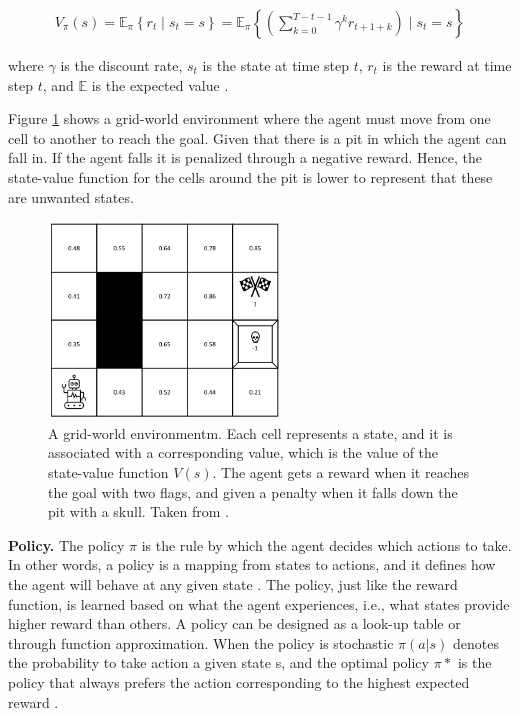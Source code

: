 \begin{gather}
   V_{\pi}(s)=\mathbb{E}_{\pi}\left\{r_{t} \mid s_{t}=s\right\}=\mathbb{E}_{\pi}\left\{\left(\sum_{k=0}^{T-t-1} \gamma^{k} r_{t+1+k}\right) \mid s_{t}=s\right\} \label{eu_valuefunction}
\end{gather}
 
where $\gamma$ is the discount rate, $s_t$ is the state at time step $t$, $r_t$ is the reward at time step $t$, and $\mathbb{E}$ is the expected value \cite{eriksson2021deep}. 

Figure \ref{fig:gridworld} shows a grid-world environment where the agent must move from one cell to another to reach the goal. Given that there is a pit in which the agent can fall in. If the agent falls it is penalized through a negative reward. Hence, the state-value function for the cells around the pit is lower to represent that these are unwanted states.

\begin{figure}[!ht]
    \centering
    \includegraphics[width=0.55\textwidth]{images/gridworld.png}
    \caption{A grid-world environmentm. Each cell represents a state, and it is associated with a corresponding value, which is the value of the state-value function $V(s)$. The agent gets a reward when it reaches the goal with two flags, and given a penalty when it falls down the pit with a skull. Taken from \cite{eriksson2021deep}.
    }
    \label{fig:gridworld}
\end{figure}



\textbf{Policy.}
The policy $\pi$ is the rule by which the agent decides which actions to take. In other words, a policy is a mapping from states to actions, and it defines how the agent will behave at any given state \cite{sutton2018reinforcement}.
The policy, just like the reward function, is learned based on what the agent experiences, i.e., what states provide higher reward than others. A policy can be designed as a look-up table or through function approximation. When the policy is stochastic $\pi(a|s)$ denotes the probability to take action a given state s, and the optimal policy $\pi*$ is the policy that always prefers the action corresponding to the highest expected reward \cite{sutton2018reinforcement}. 


